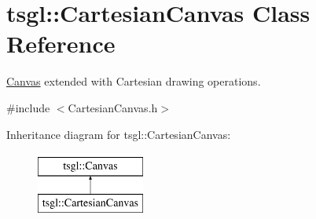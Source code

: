 \hypertarget{classtsgl_1_1_cartesian_canvas}{\section{tsgl\-:\-:\-Cartesian\-Canvas \-Class \-Reference}
\label{classtsgl_1_1_cartesian_canvas}
}


\hyperlink{classtsgl_1_1_canvas}{\-Canvas} extended with \-Cartesian drawing operations.  




{\ttfamily \#include $<$\-Cartesian\-Canvas.\-h$>$}

\-Inheritance diagram for tsgl\-:\-:\-Cartesian\-Canvas\-:\begin{figure}[H]
\begin{center}
\leavevmode
\includegraphics[height=2.000000cm]{classtsgl_1_1_cartesian_canvas}
\end{center}
\end{figure}
